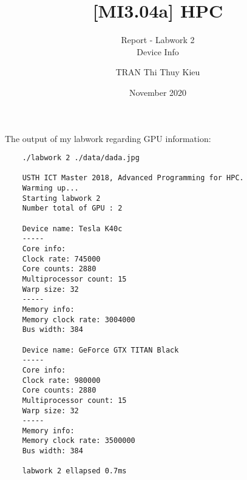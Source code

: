 \documentclass[10pt, a4paper]{article}
\title{[MI3.04a] HPC}
\subtitle{Report - Labwork 2 \\ Device Info}
\author{TRAN Thi Thuy Kieu}
\date{November 2020}
\begin{document}
\maketitle



The output of my labwork regarding GPU information:

\begin{verbatim}
    ./labwork 2 ./data/dada.jpg
    
    USTH ICT Master 2018, Advanced Programming for HPC.
    Warming up...
    Starting labwork 2
    Number total of GPU : 2

    Device name: Tesla K40c
    -----
    Core info:
    Clock rate: 745000
    Core counts: 2880
    Multiprocessor count: 15
    Warp size: 32
    -----
    Memory info: 
    Memory clock rate: 3004000
    Bus width: 384
    
    Device name: GeForce GTX TITAN Black
    -----
    Core info:
    Clock rate: 980000
    Core counts: 2880
    Multiprocessor count: 15
    Warp size: 32
    -----
    Memory info: 
    Memory clock rate: 3500000
    Bus width: 384
    
    labwork 2 ellapsed 0.7ms
\end{verbatim}
\end{document}
